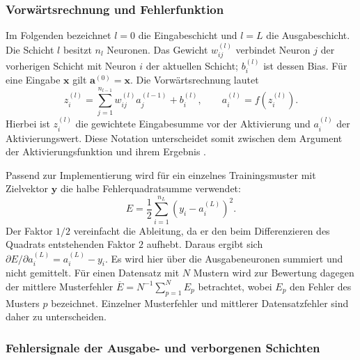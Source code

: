 \subsubsection{Vorwärtsrechnung und Fehlerfunktion}

Im Folgenden bezeichnet $l=0$ die Eingabeschicht und $l=L$ die Ausgabeschicht.
Die Schicht $l$ besitzt $n_l$ Neuronen. Das Gewicht $w_{ij}^{(l)}$ verbindet
Neuron $j$ der vorherigen Schicht mit Neuron $i$ der aktuellen Schicht;
$b_i^{(l)}$ ist dessen Bias. Für eine Eingabe $\boldsymbol{x}$ gilt
$\boldsymbol{a}^{(0)}=\boldsymbol{x}$. Die Vorwärtsrechnung lautet
\begin{equation}
	z_i^{(l)} = \sum_{j=1}^{n_{l-1}} w_{ij}^{(l)} a_j^{(l-1)} + b_i^{(l)},
	\qquad a_i^{(l)} = f\!\left(z_i^{(l)}\right).
	\label{eq:bp-forward}
\end{equation}
Hierbei ist $z_i^{(l)}$ die gewichtete Eingabesumme vor der Aktivierung und
$a_i^{(l)}$ der Aktivierungswert. Diese Notation unterscheidet somit zwischen
dem Argument der Aktivierungsfunktion und ihrem Ergebnis
\parencite[Kap.~2]{nielsen2015}.

Passend zur Implementierung wird für ein einzelnes Trainingsmuster mit
Zielvektor $\boldsymbol{y}$ die halbe Fehlerquadratsumme verwendet:
\begin{equation}
	E = \frac{1}{2}\sum_{i=1}^{n_L}\left(y_i-a_i^{(L)}\right)^2.
	\label{eq:bp-loss}
\end{equation}
Der Faktor $1/2$ vereinfacht die Ableitung, da er den beim Differenzieren des
Quadrats entstehenden Faktor $2$ aufhebt. Daraus ergibt sich
$\partial E/\partial a_i^{(L)}=a_i^{(L)}-y_i$. Es wird hier über die
Ausgabeneuronen summiert und nicht gemittelt. Für einen Datensatz mit $N$
Mustern wird zur Bewertung dagegen der mittlere Musterfehler
$\overline{E}=N^{-1}\sum_{p=1}^{N}E_p$ betrachtet, wobei $E_p$ den Fehler
des Musters $p$ bezeichnet. Einzelner Musterfehler und mittlerer
Datensatzfehler sind daher zu unterscheiden.

\subsubsection{Fehlersignale der Ausgabe- und verborgenen Schichten}


